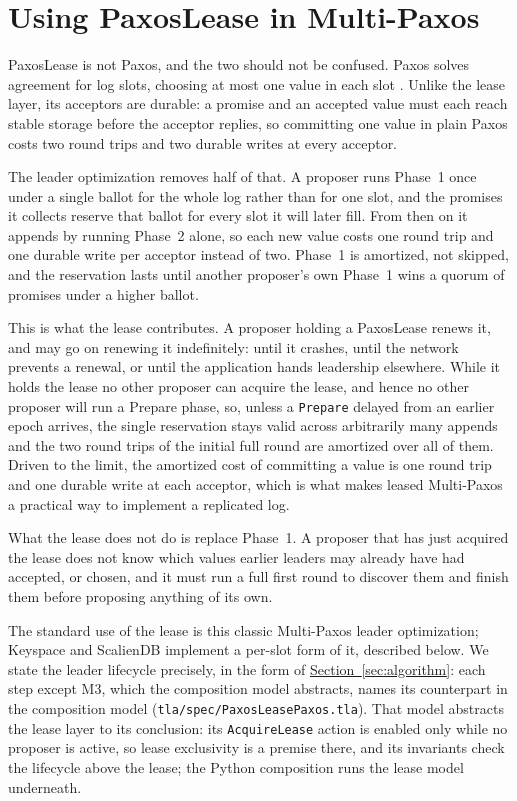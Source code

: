 \documentclass[final,5p,times,twocolumn,number]{elsarticle}
\newcommand{\code}[1]{\texttt{#1}}
\newcommand{\secref}[1]{\hyperref[#1]{Section~\ref*{#1}}}
\begin{document}
\section{Using PaxosLease in Multi-Paxos}\label{sec:paxos}

PaxosLease is not Paxos, and the two should not be confused.  Paxos solves agreement for log slots, choosing at most one value in each slot \cite{ref2}.  Unlike the lease layer, its acceptors are durable: a promise and an accepted value must each reach stable storage before the acceptor replies, so committing one value in plain Paxos costs two round trips and two durable writes at every acceptor.

The leader optimization removes half of that.  A proposer runs Phase~1 once under a single ballot for the whole log rather than for one slot, and the promises it collects reserve that ballot for every slot it will later fill.  From then on it appends by running Phase~2 alone, so each new value costs one round trip and one durable write per acceptor instead of two.  Phase~1 is amortized, not skipped, and the reservation lasts until another proposer's own Phase~1 wins a quorum of promises under a higher ballot.

This is what the lease contributes.  A proposer holding a PaxosLease renews it, and may go on renewing it indefinitely: until it crashes, until the network prevents a renewal, or until the application hands leadership elsewhere.  While it holds the lease no other proposer can acquire the lease, and hence no other proposer will run a Prepare phase, so, unless a \code{Prepare} delayed from an earlier epoch arrives, the single reservation stays valid across arbitrarily many appends and the two round trips of the initial full round are amortized over all of them.  Driven to the limit, the amortized cost of committing a value is one round trip and one durable write at each acceptor, which is what makes leased Multi-Paxos a practical way to implement a replicated log.

What the lease does not do is replace Phase~1.  A proposer that has just acquired the lease does not know which values earlier leaders may already have had accepted, or chosen, and it must run a full first round to discover them and finish them before proposing anything of its own.

The standard use of the lease is this classic Multi-Paxos leader optimization; Keyspace and ScalienDB implement a per-slot form of it, described below.  We state the leader lifecycle precisely, in the form of \secref{sec:algorithm}: each step except M3, which the composition model abstracts, names its counterpart in the composition model (\code{tla/spec/PaxosLeasePaxos.tla}).  That model abstracts the lease layer to its conclusion: its \code{AcquireLease} action is enabled only while no proposer is active, so lease exclusivity is a premise there, and its invariants check the lifecycle above the lease; the Python composition runs the lease model underneath.
\end{document}

